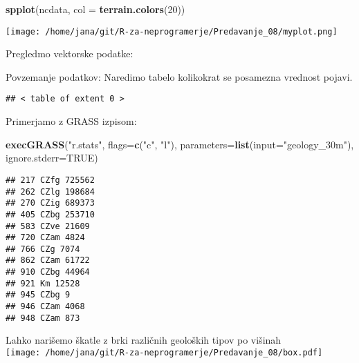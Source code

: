 \documentclass[]{article}
\newenvironment{Shaded}{\begin{snugshade}}{\end{snugshade}}
\newcommand{\KeywordTok}[1]{\textcolor[rgb]{0.13,0.29,0.53}{\textbf{#1}}}
\newcommand{\DataTypeTok}[1]{\textcolor[rgb]{0.13,0.29,0.53}{#1}}
\newcommand{\DecValTok}[1]{\textcolor[rgb]{0.00,0.00,0.81}{#1}}
\newcommand{\StringTok}[1]{\textcolor[rgb]{0.31,0.60,0.02}{#1}}
\newcommand{\OtherTok}[1]{\textcolor[rgb]{0.56,0.35,0.01}{#1}}
\newcommand{\OperatorTok}[1]{\textcolor[rgb]{0.81,0.36,0.00}{\textbf{#1}}}
\newcommand{\NormalTok}[1]{#1}
\begin{document}
\begin{Shaded}
\begin{Highlighting}[]
\KeywordTok{spplot}\NormalTok{(ncdata, }\DataTypeTok{col =} \KeywordTok{terrain.colors}\NormalTok{(}\DecValTok{20}\NormalTok{))}
\end{Highlighting}
\end{Shaded}

\texttt{[image: /home/jana/git/R-za-neprogramerje/Predavanje\_08/myplot.png]}

Pregledmo vektorske podatke:

Povzemanje podatkov: Naredimo tabelo kolikokrat se posamezna vrednost
pojavi.

\begin{Shaded}
\end{Shaded}

\begin{verbatim}
## < table of extent 0 >
\end{verbatim}

Primerjamo z GRASS izpisom:

\begin{Shaded}
\begin{Highlighting}[]
\KeywordTok{execGRASS}\NormalTok{(}\StringTok{"r.stats"}\NormalTok{, }\DataTypeTok{flags=}\KeywordTok{c}\NormalTok{(}\StringTok{"c"}\NormalTok{, }\StringTok{"l"}\NormalTok{), }\DataTypeTok{parameters=}\KeywordTok{list}\NormalTok{(}\DataTypeTok{input=}\StringTok{"geology_30m"}\NormalTok{), }\DataTypeTok{ignore.stderr=}\OtherTok{TRUE}\NormalTok{)}
\end{Highlighting}
\end{Shaded}

\begin{verbatim}
## 217 CZfg 725562
## 262 CZlg 198684
## 270 CZig 689373
## 405 CZbg 253710
## 583 CZve 21609
## 720 CZam 4824
## 766 CZg 7074
## 862 CZam 61722
## 910 CZbg 44964
## 921 Km 12528
## 945 CZbg 9
## 946 CZam 4068
## 948 CZam 873

\end{verbatim}

Lahko narišemo škatle z brki različnih geoloških tipov po višinah
\\
\texttt{[image: /home/jana/git/R-za-neprogramerje/Predavanje\_08/box.pdf]}
\\
\end{document}
